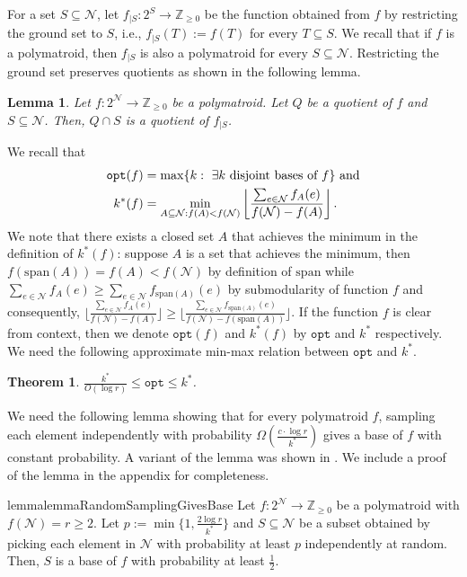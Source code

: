 \documentclass[11pt]{article}
\newtheorem{theorem}{Theorem}
\newtheorem{lemma}{Lemma}
\theoremstyle{definition}
\newcommand{\calN}{{\mathcal{N}}}
\newcommand{\opt}{\texttt{opt}}
\begin{document}
For a set $S\subseteq \mathcal{N}$, let $f_{|S}:2^S\rightarrow \mathbb{Z}_{\geq 0}$ be the function obtained from $f$ by restricting the ground set to $S$, i.e., $f_{|S}(T):=f(T)$ for every $T\subseteq S$. We recall that if $f$ is a polymatroid, then $f_{|S}$ is also a polymatroid for every $S\subseteq \calN$. Restricting the ground set preserves quotients as shown in the following lemma.
\begin{lemma}\cite{quanrud2024quotient}\label{lemma:restrict-quotient}
    Let $f:2^\mathcal{N}\rightarrow \mathbb{Z}_{\geq 0}$ be a polymatroid. Let $Q$ be a quotient of $f$ and $S\subseteq\mathcal{N}$. Then, $Q\cap S$ is a quotient of $f_{|S}$.
\end{lemma}



We recall that 
\begin{align}
    \opt(f)&=\max\{k:\ \exists k \text{ disjoint bases of }f\}\ \text{and}\notag\\
    k^*(f)&=\min_{A\subseteq \mathcal{N}: f(A)<f(\mathcal{N})} \left\lfloor \frac{\sum_{e\in \mathcal{N}}f_A(e)}{f(\mathcal{N})-f(A)}\right\rfloor. \label{def:opt-k}
\end{align}
We note that there exists a closed set $A$ that achieves the minimum in the definition of $k^*(f)$: suppose $A$ is a set that achieves the minimum, then $f(\text{span}(A))=f(A)<f(\calN)$ by definition of $\text{span}$ while $\sum_{e\in \mathcal{N}} f_A(e) \geq \sum_{e\in \mathcal{N}}f_{\text{span}(A)}(e)$ by submodularity of function $f$ and consequently, $\lfloor\frac{\sum_{e\in \mathcal{N}}f_A(e)}{f(\mathcal{N})-f(A)}\rfloor\ge \lfloor\frac{\sum_{e\in \mathcal{N}}f_{\text{span}(A)}(e)}{f(\mathcal{N})-f(\text{span}(A))}\rfloor$.
If the function $f$ is clear from context, then we denote $\opt(f)$ and $k^*(f)$ by $\opt$ and $k^*$ respectively. 
We need the following approximate min-max relation between $\opt$ and $k^*$. 
\begin{theorem}\cite{CCV09}\label{thm:CCV-k^*}
    $\frac{k^*}{O(\log r)}\leq \opt\leq k^*$.
\end{theorem}



We need the following lemma showing that for every polymatroid $f$, sampling each element independently with probability $\Omega\left(\frac{c\cdot \log r}{k^*}\right)$ gives a base of $f$ with constant probability. A variant of the lemma was shown in \cite{CCV09}. We include a proof of the lemma in the appendix for completeness. 


\begin{restatable}{lemma}{lemmaRandomSamplingGivesBase}\label{lemma:sampling-property}
    Let $f:2^{\mathcal{N}}\rightarrow \mathbb{Z}_{\geq 0}$ be a polymatroid with $f(\mathcal{N})=r\geq 2$. Let $p:=\min\{1, \frac{2\log r}{k^*}\}$ and $S\subseteq \mathcal{N}$ be a subset obtained by picking each element in $\mathcal{N}$ with probability at least $p$ independently at random. Then, $S$ is a base of $f$ with probability at least $\frac{1}{2}$.
\end{restatable}
\end{document}
